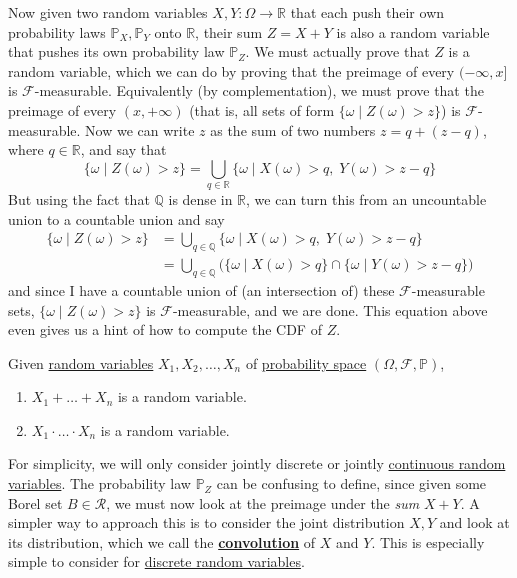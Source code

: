   Now given two random variables $X, Y: \Omega \rightarrow \mathbb{R}$ that each push their own probability laws $\mathbb{P}_X, \mathbb{P}_Y$ onto $\mathbb{R}$, their sum $Z = X + Y$ is also a random variable that pushes its own probability law $\mathbb{P}_Z$. We must actually prove that $Z$ is a random variable, which we can do by proving that the preimage of every $(-\infty, x]$ is $\mathcal{F}$-measurable. Equivalently (by complementation), we must prove that the preimage of every $(x, +\infty)$ (that is, all sets of form $\{ \omega \mid Z(\omega) > z\}$) is $\mathcal{F}$-measurable. Now we can write $z$ as the sum of two numbers $z = q + (z - q)$, where $q \in \mathbb{R}$, and say that 
  \begin{equation}
    \{ \omega \mid Z(\omega) > z\} = \bigcup_{q \in \mathbb{R}} \{ \omega \mid X (\omega) > q , \; Y(\omega) > z - q\}
  \end{equation}
  But using the fact that $\mathbb{Q}$ is dense in $\mathbb{R}$, we can turn this from an uncountable union to a countable union and say 
  \begin{align}
    \{ \omega \mid Z(\omega) > z\} & = \bigcup_{q \in \mathbb{Q}} \{ \omega \mid X (\omega) > q , \; Y(\omega) > z - q\} \\
    & = \bigcup_{q \in \mathbb{Q}} \big( \{\omega \mid X(\omega) > q\} \cap \{ \omega \mid Y(\omega) > z - q\} \big) 
  \end{align}
  and since I have a countable union of (an intersection of) these $\mathcal{F}$-measurable sets, $\{ \omega \mid Z(\omega) > z\}$ is $\mathcal{F}$-measurable, and we are done. This equation above even gives us a hint of how to compute the CDF of $Z$. 

  \begin{theorem}
    \label{thm:sums-and-products-of-random-variables}
    Given \hyperref[def:random-variable]{random variables} $X_1, X_2, \ldots, X_n$ of \hyperref[def:probability-space]{probability space} $(\Omega, \mathcal{F}, \mathbb{P})$, 
    \begin{enumerate}
      \item $X_1 + \ldots + X_n$ is a random variable.
      \item $X_1 \cdot \ldots \cdot X_n$ is a random variable. 
    \end{enumerate}
  \end{theorem}

  For simplicity, we will only consider jointly discrete or jointly \hyperref[def:continuous-random-variable]{continuous random variables}. The probability law $\mathbb{P}_Z$ can be confusing to define, since given some Borel set $B \in \mathcal{R}$, we must now look at the preimage under the \textit{sum} $X + Y$. A simpler way to approach this is to consider the joint distribution $X, Y$ and look at its distribution, which we call the \textbf{\hyperref[real-thm:convolution]{convolution}} of $X$ and $Y$. This is especially simple to consider for \hyperref[def:discrete-random-variable]{discrete random variables}. 

